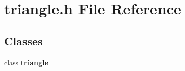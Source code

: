 \section{triangle.h File Reference}
\label{triangle_8h}
\subsection*{Classes}
\begin{CompactItemize}
\item 
class {\bf triangle}
\end{CompactItemize}
